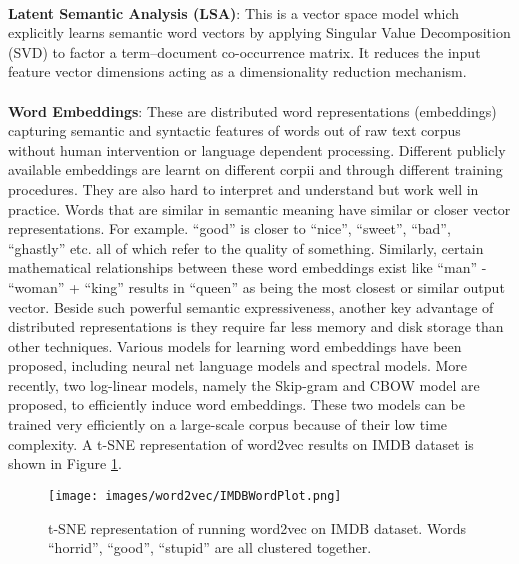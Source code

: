 \documentclass[a4paper,26pt]{article}
\begin{document}
\paragraph{}
\textbf{Latent Semantic Analysis (LSA)}: This is a vector space model which explicitly learns semantic word vectors by applying Singular Value Decomposition (SVD) to factor a term–document co-occurrence matrix. It reduces the input feature vector dimensions acting as a dimensionality reduction mechanism.

\paragraph{}
\textbf{Word Embeddings}: These are distributed word representations (embeddings) capturing semantic and syntactic features of words out of raw text corpus without human intervention or language dependent processing. Different publicly available embeddings are learnt on different corpii and through different training procedures. They are also hard to interpret and understand but work well in practice. Words that are similar in semantic meaning have similar or closer vector representations. For example. ``good'' is closer to ``nice'', ``sweet'', ``bad'', ``ghastly'' etc. all of which refer to the quality of something. Similarly, certain mathematical relationships between these word embeddings exist like ``man'' - ``woman'' + ``king'' results in ``queen'' as being the most closest or similar output vector. Beside such powerful semantic expressiveness, another key advantage of distributed representations is they require far less memory and disk storage than other techniques. Various models for learning word embeddings have been proposed, including neural net language models  and spectral models. More recently, two log-linear models, namely the Skip-gram and CBOW model are proposed, to efficiently induce word embeddings. These two models can be trained very efficiently on a large-scale corpus because of their low time complexity. A t-SNE representation of word2vec results on IMDB dataset is shown in Figure \ref{fig:tsne-word2vec}.

\begin{figure}[H]
        \centering
       { \texttt{[image: images/word2vec/IMDBWordPlot.png]}}
        \caption{t-SNE representation of running word2vec on IMDB dataset. Words ``horrid'', ``good'', ``stupid'' are all clustered together.}
        \label{fig:tsne-word2vec}
    \end{figure}
\end{document}
